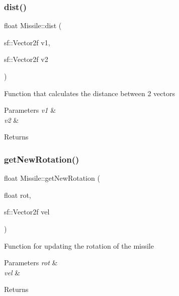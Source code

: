 \subsubsection{\texorpdfstring{dist()}{dist()}}
{\footnotesize\ttfamily float Missile\+::dist (\begin{DoxyParamCaption}\item[{sf\+::\+Vector2f}]{v1,  }\item[{sf\+::\+Vector2f}]{v2 }\end{DoxyParamCaption})}



Function that calculates the distance between 2 vectors 


\begin{DoxyParams}{Parameters}
{\em v1} & \\
\hline
{\em v2} & \\
\hline
\end{DoxyParams}
\begin{DoxyReturn}{Returns}

\end{DoxyReturn}
\mbox{\label{class_missile_a286613c45f833883801ee1b90f841e37}} 
\subsubsection{\texorpdfstring{getNewRotation()}{getNewRotation()}}
{\footnotesize\ttfamily float Missile\+::get\+New\+Rotation (\begin{DoxyParamCaption}\item[{float}]{rot,  }\item[{sf\+::\+Vector2f}]{vel }\end{DoxyParamCaption})}



Function for updating the rotation of the missile 


\begin{DoxyParams}{Parameters}
{\em rot} & \\
\hline
{\em vel} & \\
\hline
\end{DoxyParams}
\begin{DoxyReturn}{Returns}

\end{DoxyReturn}
\mbox{\label{class_missile_a81919e4b6e417b114a61e88fa608c6e5}} 
